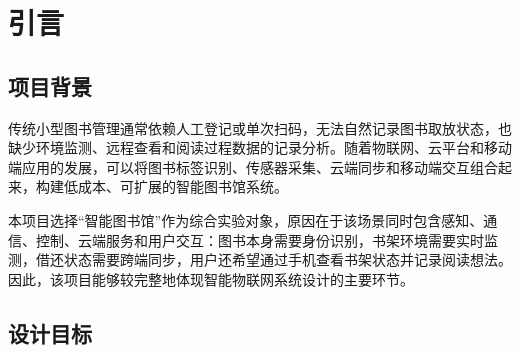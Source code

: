 \documentclass[12pt,hyperref,a4paper,UTF8]{ctexart}
\begin{document}
\cover
\thispagestyle{empty}

\newpage

\begin{abstract}
本实验设计并实现了一套基于 ESP32 与华为云的智能图书馆物联网系统。
系统以 ESP32 DevKitC 为核心控制器，
集成 MF-RC522 NFC 读卡器、
M803D条码扫描模块、
BMP280 温度传感器、
DHT11 湿度传感器、
光敏电阻、
OLED 显示屏、
RGB 指示灯和风扇执行机构，
实现图书注册、借还状态感知记录、
环境数据采集、湿度联动除湿和本地状态显示等功能。

云端侧主要使用华为云 IoTDA 完成设备接入、属性上报、设备影子查询和命令下发，
使用 OBS 对象存储保存图书档案、借还历史和阅读笔记。
需要主动访问云端接口的操作大多集成在微信小程序端完成，
包括设备影子读取、图书信息查询、OBS 文件读写、远程控制以及 AI 对话；
由于华为云 FunctionGraph 功能在升级阶段，无法申请使用，
故仅作为 ISBN 查询与命令下发的一种可选尝试方案。
补充实验中还验证了 ESP32 通过 HTTPS 直接调用 DeepSeek API 的可行性，
用于理解边缘设备接入云端 AI 服务的通信流程与资源约束。
测试结果表明，系统能够稳定完成设备、小程序与云平台之间的数据同步，
借还事件响应及时，环境监测与风扇控制逻辑有效，
具备比较完整的智能图书馆原型系统价值。
\end{abstract}

\thispagestyle{empty}

\newpage
\tableofcontents
\newpage

\section{引言}

\subsection{项目背景}

传统小型图书管理通常依赖人工登记或单次扫码，无法自然记录图书取放状态，也缺少环境监测、远程查看和阅读过程数据的记录分析。随着物联网、云平台和移动端应用的发展，可以将图书标签识别、传感器采集、云端同步和移动端交互组合起来，构建低成本、可扩展的智能图书馆系统。

本项目选择“智能图书馆”作为综合实验对象，原因在于该场景同时包含感知、通信、控制、云端服务和用户交互：图书本身需要身份识别，书架环境需要实时监测，借还状态需要跨端同步，用户还希望通过手机查看书架状态并记录阅读想法。因此，该项目能够较完整地体现智能物联网系统设计的主要环节。

\subsection{设计目标}
\end{document}
